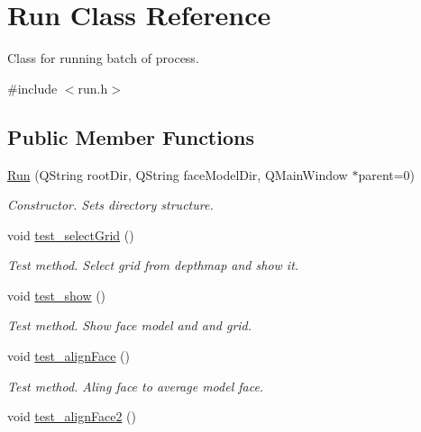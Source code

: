 \hypertarget{class_run}{\section{Run Class Reference}
\label{class_run}
}


Class for running batch of process.  




{\ttfamily \#include $<$run.\+h$>$}

\subsection*{Public Member Functions}
\begin{DoxyCompactItemize}
\item 
\hyperlink{class_run_a3ed172056dd77e32c7f8e314de5ee999}{Run} (Q\+String root\+Dir, Q\+String face\+Model\+Dir, Q\+Main\+Window $\ast$parent=0)
\begin{DoxyCompactList}\small\item\em Constructor. Sets directory structure. \end{DoxyCompactList}\item 
\hypertarget{class_run_a1bd95059626eac892d53fea6f0a0955e}{void \hyperlink{class_run_a1bd95059626eac892d53fea6f0a0955e}{test\+\_\+select\+Grid} ()}\label{class_run_a1bd95059626eac892d53fea6f0a0955e}

\begin{DoxyCompactList}\small\item\em Test method. Select grid from depthmap and show it. \end{DoxyCompactList}\item 
\hypertarget{class_run_abc9394bad2c0e4d563018bd2963309a1}{void \hyperlink{class_run_abc9394bad2c0e4d563018bd2963309a1}{test\+\_\+show} ()}\label{class_run_abc9394bad2c0e4d563018bd2963309a1}

\begin{DoxyCompactList}\small\item\em Test method. Show face model and and grid. \end{DoxyCompactList}\item 
\hypertarget{class_run_a51f2530130e010f28180b4a4843fbe26}{void \hyperlink{class_run_a51f2530130e010f28180b4a4843fbe26}{test\+\_\+align\+Face} ()}\label{class_run_a51f2530130e010f28180b4a4843fbe26}

\begin{DoxyCompactList}\small\item\em Test method. Aling face to average model face. \end{DoxyCompactList}\item 
\hypertarget{class_run_a48744b232f7a3b2cce89496880a219b5}{void \hyperlink{class_run_a48744b232f7a3b2cce89496880a219b5}{test\+\_\+align\+Face2} ()}\label{class_run_a48744b232f7a3b2cce89496880a219b5}


\end{DoxyCompactItemize}
